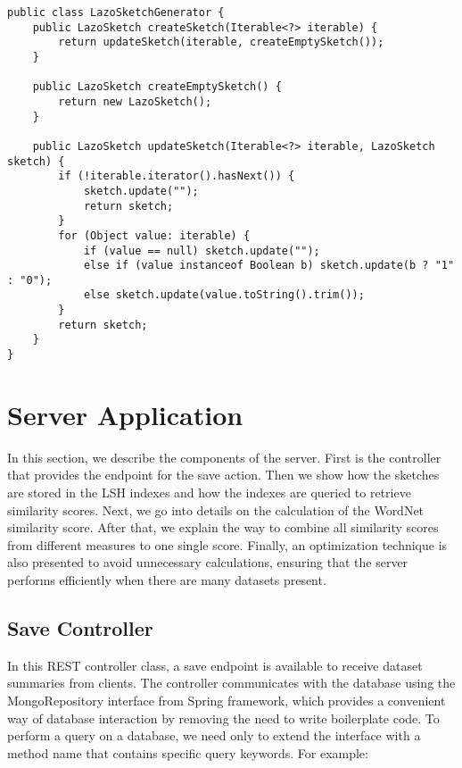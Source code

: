 \begin{lstlisting}[caption=The SketchGenerator class, label=lst:sketchGenerator]
public class LazoSketchGenerator {
    public LazoSketch createSketch(Iterable<?> iterable) {
        return updateSketch(iterable, createEmptySketch());
    }

    public LazoSketch createEmptySketch() {
        return new LazoSketch();
    }

    public LazoSketch updateSketch(Iterable<?> iterable, LazoSketch sketch) {
        if (!iterable.iterator().hasNext()) {
            sketch.update("");
            return sketch;
        }
        for (Object value: iterable) {
            if (value == null) sketch.update("");
            else if (value instanceof Boolean b) sketch.update(b ? "1" : "0");
            else sketch.update(value.toString().trim());
        }
        return sketch;
    }
}
\end{lstlisting}

\section{Server Application}

In this section, we describe the components of the server. First is the controller that provides the endpoint for the save action. Then we show how the sketches are stored in the LSH indexes and how the indexes are queried to retrieve similarity scores. Next, we go into details on the calculation of the WordNet similarity score. After that, we explain the way to combine all similarity scores from different measures to one single score. Finally, an optimization technique is also presented to avoid unnecessary calculations, ensuring that the server performs efficiently when there are many datasets present.

\subsection{Save Controller}\label{saveController}

In this REST controller class, a save endpoint is available to receive dataset summaries from clients. The controller communicates with the database using the MongoRepository interface from Spring framework, which provides a convenient way of database interaction by removing the need to write boilerplate code. To perform a query on a database, we need only to extend the interface with a method name that contains specific query keywords. For example:


